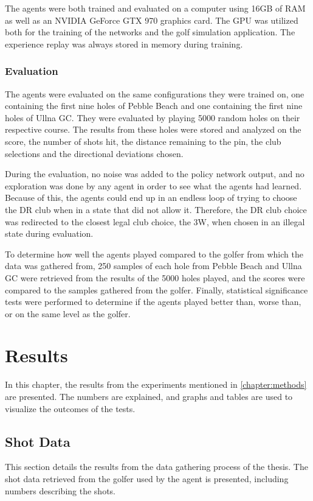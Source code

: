 \documentclass{kththesis}
\begin{document}
The agents were both trained and evaluated on a computer using 16GB of RAM as well as an NVIDIA GeForce GTX 970 graphics card. The GPU was utilized both for the training of the networks and the golf simulation application. The experience replay was always stored in memory during training.

\subsection{Evaluation}
The agents were evaluated on the same configurations they were trained on, one containing the first nine holes of Pebble Beach and one containing the first nine holes of Ullna GC. They were evaluated by playing 5000 random holes on their respective course. The results from these holes were stored and analyzed on the score, the number of shots hit, the distance remaining to the pin, the club selections and the directional deviations chosen.

During the evaluation, no noise was added to the policy network output, and no exploration was done by any agent in order to see what the agents had learned. Because of this, the agents could end up in an endless loop of trying to choose the DR club when in a state that did not allow it. Therefore, the DR club choice was redirected to the closest legal club choice, the 3W, when chosen in an illegal state during evaluation.

To determine how well the agents played compared to the golfer from which the data was gathered from, 250 samples of each hole from Pebble Beach and Ullna GC were retrieved from the results of the 5000 holes played, and the scores were compared to the samples gathered from the golfer. Finally, statistical significance tests were performed to determine if the agents played better than, worse than, or on the same level as the golfer.

\chapter{Results}
\label{chapter:results}
In this chapter, the results from the experiments mentioned in \autoref{chapter:methods} are presented. The numbers are explained, and graphs and tables are used to visualize the outcomes of the tests.

\section{Shot Data}
This section details the results from the data gathering process of the thesis. The shot data retrieved from the golfer used by the agent is presented, including numbers describing the shots.
\end{document}
